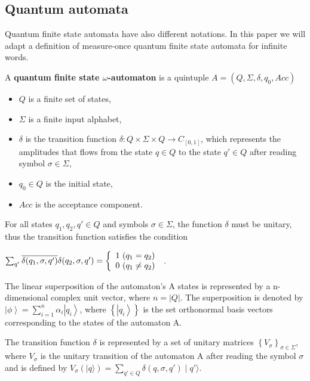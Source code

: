 \documentclass{llncs}
\begin{document}
\bigskip

\subsection{Quantum automata}

Quantum finite state automata have also different notations. In this paper we will adapt %
a definition of measure-once quantum finite state automata \cite{Mo97} 
for infinite words.
%
\begin{definition}
A \textbf{quantum finite state $\omega$-automaton} is a quintuple $A=(Q, \Sigma, \delta, q_{0}, Acc)$
\begin{itemize}
\item $Q$ is a finite set of states,
\item $\Sigma$ is a finite input alphabet,
\item $\delta$ is the transition function $\delta : Q \times \Sigma \times Q \rightarrow C_{[0,1]}$, which represents the amplitudes that flows from the state $q \in Q$ to the state $q' \in Q$ after reading symbol $\sigma \in \Sigma$,
\item $q_0 \in Q$ is the initial state,
\item $Acc$ is the acceptance component. 
\end{itemize}
For all states $q_{1}, q_{2}, q' \in Q$ and symbols $\sigma \in \Sigma$, the function $\delta$ must be unitary, thus the transition function satisfies the condition 
\begin{center}
$\sum_{q'}\overline{\delta(q_{1}, \sigma,q')}\delta(q_{2},\sigma, q')=\left\{
\begin{array}[pos]{l}
	1 \ (q_{1} = q_{2}) \\
	0 \ (q_{1} \neq q_{2})
\end{array} \right.\ $.
\end{center}
\end{definition}
%

The linear superposition of the automaton's A states is represented by a n-dimensional complex unit vector, where $n=\left|Q\right|$. The superposition is denoted by $\left|\phi\right\rangle=\sum^{n}_{i=1}\alpha_{i} \left|q_{i}\right\rangle$, where $\left\{\left| q_{i}\right\rangle\right\}$ is the set orthonormal basis vectors corresponding to the states of the automaton A.

The transition function $\delta$ is represented by a set of unitary matrices $\left\{V_{\sigma} \right\}_{\sigma \in \Sigma}$, where $V_{\sigma}$ is the unitary transition of the automaton A after reading the symbol $\sigma$ and is defined by $V_{\sigma}(\mid q \rangle)=\sum_{q'\in Q}\delta(q,\sigma , q')\mid q' \rangle$.
\end{document}
